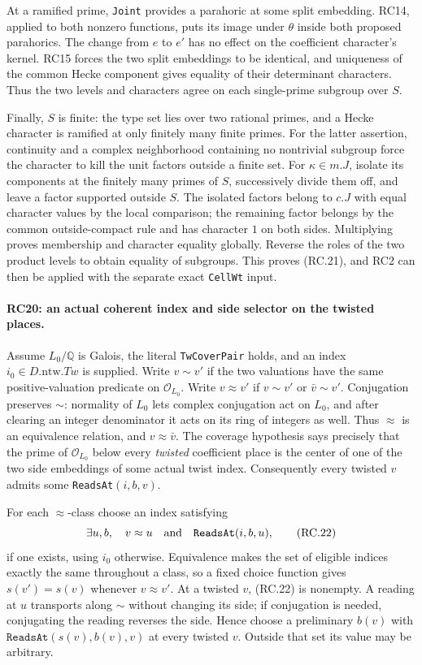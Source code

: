 At a ramified prime, \texttt{Joint} provides a parahoric at some split
embedding. RC14, applied to both nonzero functions, puts its image
under $\theta$ inside both proposed parahorics. The change from $e$
to $e'$ has no effect on the coefficient character's kernel.
RC15 forces the two split embeddings to be identical, and uniqueness
of the common Hecke component gives equality of their determinant
characters. Thus the two levels and characters agree on each
single-prime subgroup over $S$.

Finally, $S$ is finite: the type set lies over two rational primes,
and a Hecke character is ramified at only finitely many finite primes.
For the latter assertion, continuity and a complex neighborhood
containing no nontrivial subgroup force the character to kill the
unit factors outside a finite set.
For $\kappa\in m.J$, isolate its components at the finitely many primes
of $S$, successively divide them off, and leave a factor supported
outside $S$. The isolated factors belong to $c.J$ with equal character
values by the local comparison; the remaining factor belongs by the
common outside-compact rule and has character $1$ on both sides.
Multiplying proves membership and character equality globally.
Reverse the roles of the two product levels to obtain equality of
subgroups. This proves (RC.21), and RC2 can then be applied with the
separate exact \texttt{CellWt} input.

\paragraph{RC20: an actual coherent index and side selector on the twisted places.}
Assume $L_0/\mathbb Q$ is Galois, the literal
\texttt{TwCoverPair} holds, and an index $i_0\in D.\mathrm{ntw}.Tw$
is supplied. Write $v\sim v'$ if the two valuations have the same
positive-valuation predicate on $\mathcal O_{L_0}$. Write $v\approx v'$
if $v\sim v'$ or $\bar v\sim v'$.
Conjugation preserves $\sim$: normality of $L_0$ lets complex conjugation
act on $L_0$, and after clearing an integer denominator it acts on
its ring of integers as well. Thus $\approx$ is an equivalence relation,
and $v\approx\bar v$.
The coverage hypothesis says precisely that the prime of
$\mathcal O_{L_0}$ below every \emph{twisted} coefficient place is
the center of one of the two side embeddings of some actual twist index.
Consequently every twisted $v$ admits some \texttt{ReadsAt}$(i,b,v)$.

For each $\approx$-class choose an index satisfying
\[
 \exists u,b,\quad v\approx u\quad\hbox{and}\quad
                  \texttt{ReadsAt}(i,b,u),                    \tag{RC.22}
\]
if one exists, using $i_0$ otherwise. Equivalence makes the set of
eligible indices exactly the same throughout a class, so a fixed
choice function gives $s(v')=s(v)$ whenever $v\approx v'$.
At a twisted $v$, (RC.22) is nonempty. A reading at $u$ transports
along $\sim$ without changing its side; if conjugation is needed,
conjugating the reading reverses the side. Hence choose a preliminary
$b(v)$ with $\texttt{ReadsAt}(s(v),b(v),v)$ at every twisted $v$.
Outside that set its value may be arbitrary.

